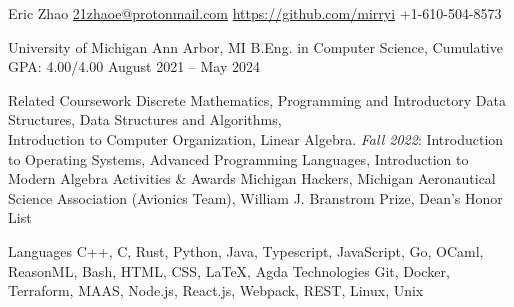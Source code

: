 \documentclass[letterpaper,11pt]{article}
\begin{document}
\rheading
  {Eric Zhao}
  {\href{mailto:21zhaoe@protonmail.com}{21zhaoe@protonmail.com}}
  {\href{https://github.com/mirryi}{https://github.com/mirryi}}
  {+1-610-504-8573}

  \begin{rsectionlist}
    \rsectionitem%
      {University of Michigan}
      {Ann Arbor, MI}
      {B.Eng. in Computer Science, Cumulative GPA: 4.00/4.00}
      {August 2021 -- May 2024}
      \begin{rpointlist}
        \rpoint
          {Related Coursework}
          {Discrete Mathematics, Programming and Introductory Data Structures, Data Structures and
            Algorithms, \\ Introduction to Computer Organization, Linear Algebra.
            \emph{Fall 2022}: Introduction to Operating Systems, Advanced Programming Languages,
            Introduction to Modern Algebra}
        \rpoint
          {Activities \& Awards}
          {Michigan Hackers, Michigan Aeronautical Science Association (Avionics Team), William J.
            Branstrom Prize, Dean's Honor List}
      \end{rpointlist}
  \end{rsectionlist}

  \begin{rlinelist}
    \rline
      {Languages}
      {C++, C, Rust, Python, Java, Typescript, JavaScript, Go, OCaml, ReasonML, Bash, HTML, CSS,
        \LaTeX, Agda}
    \rline
      {Technologies}
      {Git, Docker, Terraform, MAAS, Node.js, React.js, Webpack, REST, Linux, Unix}
  \end{rlinelist}
\end{document}
